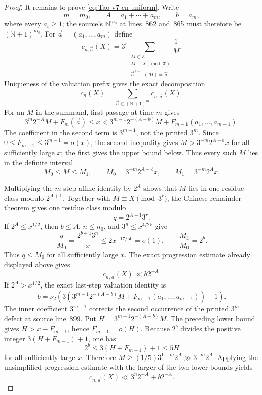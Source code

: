 \begin{proof}
It remains to prove \eqref{eq:Tao-v7-cn-uniform}.  Write
\[
 m=m_0,\qquad A=a_1+\cdots+a_m,\qquad b=a_m,
\]
where every \(a_i\geq1\); the source's \(\mathbb N^{m_0}\) at lines~862
and~865 must therefore be \((\mathbb N+1)^{m_0}\).  For
\(\vec a=(a_1,\ldots,a_m)\) define
\[
 c_{n,\vec a}(X)
 =3^r\!\!\sum_{\substack{M\in E'\\M\equiv X\pmod{3^r}\\
                  \vec a^{(m)}(M)=\vec a}}\frac1M.
\]
Uniqueness of the valuation prefix gives the exact decomposition
\[
 c_n(X)=\sum_{\vec a\in(\mathbb N+1)^m}c_{n,\vec a}(X).
\]
For an \(M\) in the summand, first passage at time \(m\) gives
\[
 3^m2^{-A}M+F_m(\vec a)\leq x
 <3^{m-1}2^{-(A-b)}M+F_{m-1}(a_1,\ldots,a_{m-1}).
\]
The coefficient in the second term is \(3^{m-1}\), not the printed \(3^m\).
Since \(0\leq F_{m-1}\leq3^{m-1}=o(x)\), the second inequality gives
\(M>3^{-m}2^{A-b}x\) for all sufficiently large \(x\); the first gives the
upper bound below.  Thus every such \(M\) lies in the definite interval
\[
 M_0\leq M\leq M_1,\qquad
 M_0=3^{-m}2^{A-b}x,\qquad
 M_1=3^{-m}2^A x.
\]

Multiplying the \(m\)-step affine identity by \(2^A\) shows that \(M\) lies
in one residue class modulo \(2^{A+1}\).  Together with
\(M\equiv X\pmod{3^r}\), the Chinese remainder theorem gives one residue
class modulo
\[
 q=2^{A+1}3^r.
\]
If \(2^A\leq x^{1/2}\), then \(b\leq A\), \(n\leq n_0\), and
\(3^n\leq x^{4/25}\) give
\[
 \frac q{M_0}=\frac{2^{b+1}3^n}{x}
 \leq2x^{-17/50}=o(1),
 \qquad \frac{M_1}{M_0}=2^b.
\]
Thus \(q\leq M_0\) for all sufficiently large \(x\).  The exact progression
estimate already displayed above gives
\begin{equation}
\label{eq:Tao-v7-cn-low-A}
 c_{n,\vec a}(X)\ll b2^{-A}.
\end{equation}
If \(2^A>x^{1/2}\), the exact last-step valuation identity is
\[
 b=\nu_2\!\left(
 3\left(3^{m-1}2^{-(A-b)}M
          +F_{m-1}(a_1,\ldots,a_{m-1})\right)+1\right).
\]
The inner coefficient \(3^{m-1}\) corrects the second occurrence of the
printed \(3^m\) defect at source line~899.  Put
\(H=3^{m-1}2^{-(A-b)}M\).  The preceding lower bound gives
\(H>x-F_{m-1}\), hence \(F_{m-1}=o(H)\).  Because \(2^b\) divides the
positive integer \(3(H+F_{m-1})+1\), one has
\[
 2^b\leq3(H+F_{m-1})+1\leq5H
\]
for all sufficiently large \(x\).  Therefore
\(M\geq(1/5)3^{1-m}2^A\gg3^{-m}2^A\).  Applying the unsimplified
progression estimate with the larger of the two lower bounds yields
\begin{equation}
\label{eq:Tao-v7-cn-high-A}
 c_{n,\vec a}(X)\ll3^n2^{-A}+b2^{-A}.
\end{equation}


\end{proof}
